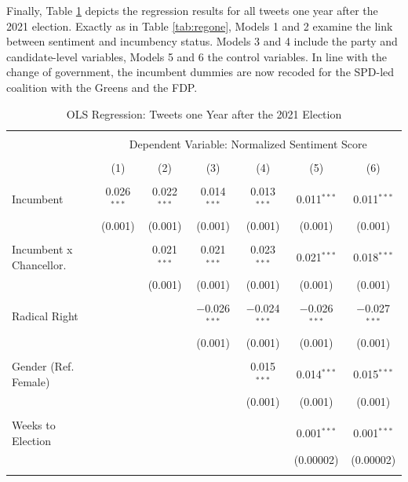 \documentclass[a4paper,11pt]{article}
\begin{document}
Finally, Table \ref{tab:regtwo} depicts the regression results for all tweets one year after the 2021 election. Exactly as in Table \ref{tab:regone}, Models 1 and 2 examine the link between sentiment and incumbency status. Models 3 and 4 include the party and candidate-level variables, Models 5 and 6 the control variables. In line with the change of government, the incumbent dummies are now recoded for the SPD-led coalition with the Greens and the FDP.

\newpage
\begin{table}[H]
    \centering
    \caption{OLS Regression: Tweets one Year after the 2021 Election}
    \label{tab:regtwo}
\begingroup 
\scriptsize 
\begin{tabular}{@{\extracolsep{5pt}}lcccccc} 
\\[-1.8ex]\hline 
\hline \\[-1.8ex] 
 & \multicolumn{6}{c}{Dependent Variable: Normalized Sentiment Score} \\ 
\cline{2-7} 
\\[-1.8ex] & (1) & (2) & (3) & (4) & (5) & (6)\\ 
\hline \\[-1.8ex] 
 Incumbent & 0.026$^{***}$ & 0.022$^{***}$ & 0.014$^{***}$ & 0.013$^{***}$ & 0.011$^{***}$ & 0.011$^{***}$ \\ 
  & (0.001) & (0.001) & (0.001) & (0.001) & (0.001) & (0.001) \\ 
  & & & & & & \\ 
 Incumbent x Chancellor.          &  & 0.021$^{***}$ & 0.021$^{***}$ & 0.023$^{***}$ & 0.021$^{***}$ & 0.018$^{***}$ \\ 
  &  & (0.001) & (0.001) & (0.001) & (0.001) & (0.001) \\ 
  & & & & & & \\ 
 Radical Right &  &  & $-$0.026$^{***}$ & $-$0.024$^{***}$ & $-$0.026$^{***}$ & $-$0.027$^{***}$ \\ 
  &  &  & (0.001) & (0.001) & (0.001) & (0.001) \\ 
  & & & & & & \\ 
 Gender (Ref. Female) &  &  &  & 0.015$^{***}$ & 0.014$^{***}$ & 0.015$^{***}$ \\ 
  &  &  &  & (0.001) & (0.001) & (0.001) \\ 
  & & & & & & \\ 
 Weeks to Election &  &  &  &  & 0.001$^{***}$ & 0.001$^{***}$ \\ 
  &  &  &  &  & (0.00002) & (0.00002) \\ 
  & & & & & & \\ 

\end{tabular}
\end{table}
\end{document}
